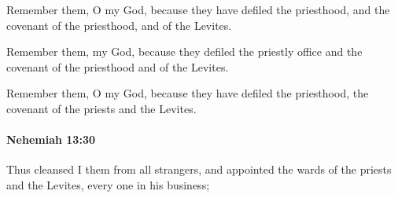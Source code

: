 			\begin{versebox}
					\item[BHS] 
					\item[LXX] 
					\item[ASV] Remember them, O my God, because they have defiled the priesthood, and the covenant of the priesthood, and of the Levites.
					\item[NIV] Remember them, my God, because they defiled the priestly office and the covenant of the priesthood and of the Levites.
					\item[NRSV] Remember them, O my God, because they have defiled the priesthood, the covenant of the priests and the Levites.
			\end{versebox}

		\paragraph{Nehemiah 13:30} %
			\label{NEHEMIAH-13-30}

			Thus cleansed I them from all strangers, and appointed the wards of the priests and the Levites, every one in his business;

